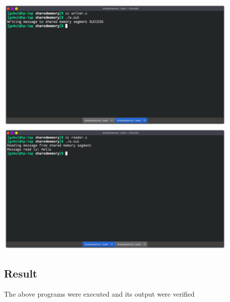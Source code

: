 \begin{center}
	\includegraphics[width=0.90\textwidth]{img/p4/ss6.png}
	\includegraphics[width=0.90\textwidth]{img/p4/ss7.png}
\end{center}


\subsection{Result}
The above programs were executed and its output were verified